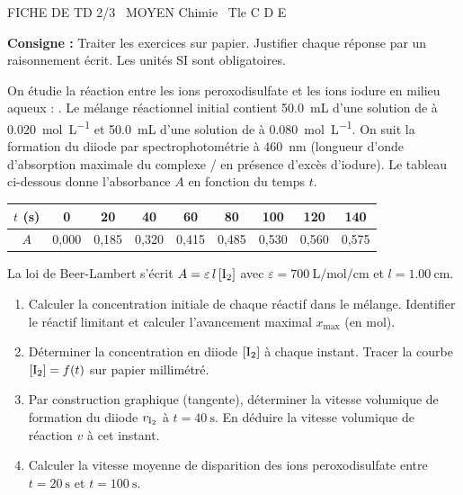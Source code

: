 \documentclass[11pt]{article}
\begin{document}
\begin{tcolorbox}[enhanced,colback=popink,colframe=popink,arc=10pt,boxrule=0pt,left=12pt,right=12pt,top=9pt,bottom=9pt]
{\color{white}\popxbold\small FICHE DE TD 2/3 \textbullet\ MOYEN \hfill Chimie \textbullet\ Tle C D E\par}
\end{tcolorbox}
\vspace{4pt}
\noindent \textbf{Consigne :} Traiter les exercices sur papier. Justifier chaque réponse par un raisonnement écrit. Les unités SI sont obligatoires.

\begin{exercice}
On étudie la réaction entre les ions peroxodisulfate  et les ions iodure  en milieu aqueux :
.
Le mélange réactionnel initial contient \SI{50,0}{\milli\liter} d'une solution de  à \SI{0,020}{\mol\per\liter} et \SI{50,0}{\milli\liter} d'une solution de  à \SI{0,080}{\mol\per\liter}. On suit la formation du diiode  par spectrophotométrie à \SI{460}{\nano\meter} (longueur d'onde d'absorption maximale du complexe / en présence d'excès d'iodure). Le tableau ci-dessous donne l'absorbance $A$ en fonction du temps $t$.

\begin{center}
\begin{tabular}{c|cccccccc}
$t$ (\si{\second}) & 0 & 20 & 40 & 60 & 80 & 100 & 120 & 140 \\
\hline
$A$ & 0,000 & 0,185 & 0,320 & 0,415 & 0,485 & 0,530 & 0,560 & 0,575 \\
\end{tabular}
\end{center}
La loi de Beer-Lambert s'écrit $A = \varepsilon \, l \, [\ce{I2}]$ avec $\varepsilon = \SI{700}{\liter\per\mol\per\centi\meter}$ et $l = \SI{1,00}{\centi\meter}$.
\begin{enumerate}
\item Calculer la concentration initiale de chaque réactif dans le mélange. Identifier le réactif limitant et calculer l'avancement maximal $x_{\text{max}}$ (en \si{\mol}).
\item Déterminer la concentration en diiode $[\ce{I2}]$ à chaque instant. Tracer la courbe $[\ce{I2}] = f(t)$ sur papier millimétré.
\item Par construction graphique (tangente), déterminer la vitesse volumique de formation du diiode $v_{\ce{I2}}$ à $t = \SI{40}{\second}$. En déduire la vitesse volumique de réaction $v$ à cet instant.
\item Calculer la vitesse moyenne de disparition des ions peroxodisulfate entre $t = \SI{20}{\second}$ et $t = \SI{100}{\second}$.
\end{enumerate}
\end{exercice}
\end{document}
